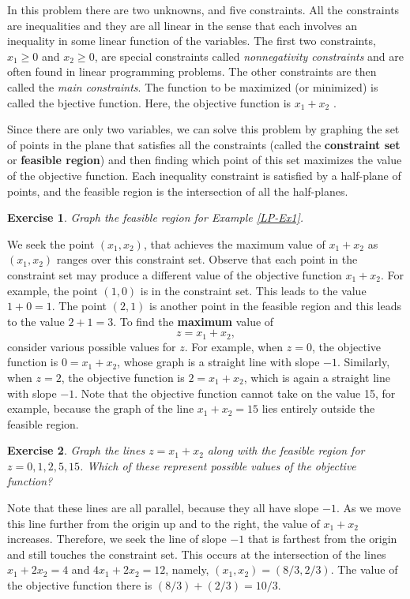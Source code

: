 \documentclass[letterpaper,10pt]{article}
\newtheorem{ex}{Exercise}
\begin{document}
In this problem there are two unknowns, and five constraints. All the constraints are inequalities and they are all linear in the sense that each involves an inequality in some linear function of the variables. The first two constraints, $x_1 \geq 0$ and $x_2\geq 0$, are special constraints called {\em nonnegativity constraints} and are often found in linear programming problems. The other constraints are then called the {\em main constraints}. The function to be maximized (or minimized) is called the bjective function. Here, the objective function is $x_1 + x_2$ .


Since there are only two variables, we can solve this problem by graphing the set of points in the plane that satisfies all the constraints (called the {\bf constraint set} or {\bf feasible region}) and then finding which point of this set maximizes the value of the objective function. Each inequality constraint is satisfied by a half-plane of points, and the feasible region is the intersection of all the half-planes. 

\begin{ex}
Graph the feasible region for Example \ref{LP-Ex1}.
\end{ex}


We seek the point $(x_1,x_2)$, that achieves the maximum value of $x_1 +x_2$ as $(x_1,x_2)$ ranges over this constraint set.  Observe that each point in the constraint set may produce a different value of the objective function $x_1+x_2$.  For example, the point $(1,0)$ is in the constraint set.  This leads to the value $1+0=1$.  The point $(2,1)$ is another point in the feasible region and this leads to the value $2+1=3$.  To find the {\bf maximum} value of $$z=x_1+x_2,$$ consider various possible values for $z$.  For example, when $z=0$, the objective function is $0=x_1+x_2$, whose graph is a straight line with slope $-1$.  Similarly, when $z=2$, the objective function is $2=x_1+x_2$, which is again a straight line with slope $-1$.  Note that the objective function cannot take on the value 15, for example, because the graph of the line $x_1+x_2=15$ lies entirely outside the feasible region.

\begin{ex}
Graph the lines $z=x_1+x_2$ along with the feasible region for $z=0,1,2,5,15$.  Which of these represent possible values of the objective function?
\end{ex}

Note that these lines are all parallel, because they all have slope $-1$.  As we move this line further from the origin up and to the right, the value of $x_1 + x_2$ increases. Therefore, we seek the line of slope $-1$ that is farthest from the origin and still touches the constraint set.  This occurs at the intersection of the lines $x_1 +2x_2 = 4$ and $4x_1 +2x_2 = 12$, namely, $\displaystyle(x_1,x_2) = (8/3,2/3)$. The value of the objective function there is $(8/3) + (2/3) = 10/3$.
\end{document}
